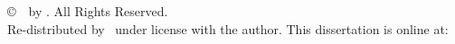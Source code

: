 \thispagestyle{fancy}
\fancyhf{}
\renewcommand{\headrulewidth}{0pt}
\fancyfoot[C]{\thepage}
\vspace*{\fill}
\begin{singlespace}
    \begin{FlushLeft}
    \copyright\ \tyearSubmitted\ by \href{\copyrightauthorlink}{\copyrightauthor}. All Rights Reserved. \\
    Re-distributed by \tinstitution\ under license with the author. 
         \doclicenseThis 
         This dissertation is online at: \href{\disserationlink}{\disserationlink}
    \end{FlushLeft}
\end{singlespace}
\vspace*{\fill}

